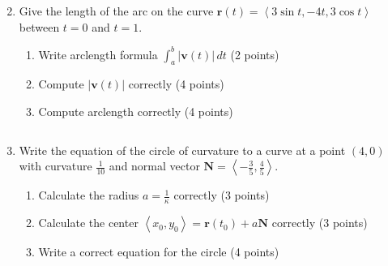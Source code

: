 \documentclass[12pt]{article}
\newcommand{\up}{$~$\vspace*{-0.7in}}
\newcommand{\liner}{\noindent\underline{\hspace*{7in}}}
\newcommand{\ds}{\displaystyle}
\renewcommand{\vec}{\mathbf}
\newcommand{\<}{\left<}
\renewcommand{\>}{\right>}
\newcommand{\dvar}{\,d}
\begin{document}
\begin{enumerate}
\vspace*{6.5in}

\liner

\newpage\up


\item Give the length of the arc on the curve $\vec{r}(t) = \left< 3\sin t, -4t, 3\cos t \right>$ between $t=0$ and $t=1$.

  \begin{enumerate}
    \item Write arclength formula $\ds \int_a^b |\vec{v}(t)| \dvar{t}$ (2 points)
    \item Compute $|\vec{v}(t)|$ correctly (4 points)
    \item Compute arclength correctly (4 points)
  \end{enumerate}

\vspace*{8in}

\liner
\newpage\up


\item Write the equation of the circle of curvature to a curve at a point $(4,0)$ with curvature $\frac{1}{10}$ and normal vector $\vec{N} = \left<-\frac{3}{5},\frac{4}{5}\right>$.

  \begin{enumerate}
    \item Calculate the radius $a = \frac{1}{\kappa}$ correctly (3 points)
    \item Calculate the center $\<x_0,y_0\> = \vec{r}(t_0) + a\vec{N}$ correctly (3 points)
    \item Write a correct equation for the circle (4 points)
  \end{enumerate}

\vspace*{7.5in}

\liner
\newpage\up




\end{enumerate}
\end{document}
